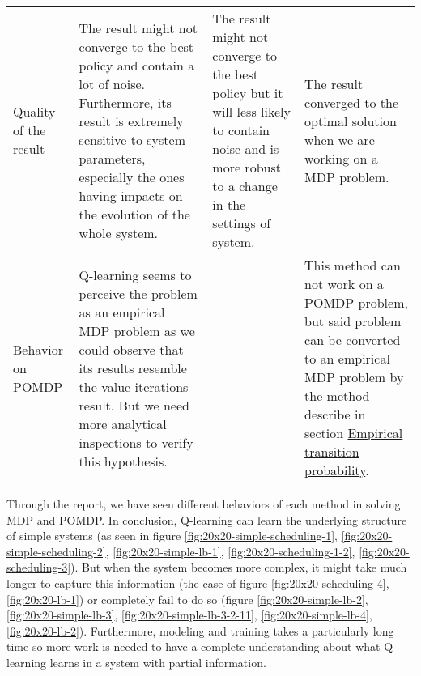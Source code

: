 \documentclass[
  a4paper, xcolor = usenames,dvipsnames]{article}
\theoremstyle{definition}
\theoremstyle{definition}
\theoremstyle{definition}
\theoremstyle{definition}
\theoremstyle{remark}
\begin{document}
\begin{longtable}[]{@{}llll@{}}
\begin{minipage}[t]{0.18\columnwidth}
Quality of the result\strut
\end{minipage} & \begin{minipage}[t]{0.35\columnwidth}\raggedright
The result might not converge to the best policy and contain a lot of noise. Furthermore, its result is extremely sensitive to system parameters, especially the ones having impacts on the evolution of the whole system.\strut
\end{minipage} & \begin{minipage}[t]{0.18\columnwidth}\raggedright
The result might not converge to the best policy but it will less likely to contain noise and is more robust to a change in the settings of system.\strut
\end{minipage} & \begin{minipage}[t]{0.18\columnwidth}\raggedright
The result converged to the optimal solution when we are working on a MDP problem.\strut
\end{minipage}\tabularnewline
\begin{minipage}[t]{0.18\columnwidth}\raggedright
Behavior on POMDP\strut
\end{minipage} & \begin{minipage}[t]{0.35\columnwidth}\raggedright
Q-learning seems to perceive the problem as an empirical MDP problem as we could observe that its results resemble the value iterations result. But we need more analytical inspections to verify this hypothesis.\strut
\end{minipage} & \begin{minipage}[t]{0.18\columnwidth}\raggedright
\strut
\end{minipage} & \begin{minipage}[t]{0.18\columnwidth}\raggedright
This method can not work on a POMDP problem, but said problem can be converted to an empirical MDP problem by the method describe in section \protect\hyperlink{empirical-transition-probability}{Empirical transition probability}.\strut
\end{minipage}\tabularnewline
\bottomrule
\end{longtable}

Through the report, we have seen different behaviors of each method in solving MDP and POMDP. In conclusion, Q-learning can learn the underlying structure of simple systems (as seen in figure \ref{fig:20x20-simple-scheduling-1}, \ref{fig:20x20-simple-scheduling-2}, \ref{fig:20x20-simple-lb-1}, \ref{fig:20x20-scheduling-1-2}, \ref{fig:20x20-scheduling-3}). But when the system becomes more complex, it might take much longer to capture this information (the case of figure \ref{fig:20x20-scheduling-4}, \ref{fig:20x20-lb-1}) or completely fail to do so (figure \ref{fig:20x20-simple-lb-2}, \ref{fig:20x20-simple-lb-3}, \ref{fig:20x20-simple-lb-3-2-11}, \ref{fig:20x20-simple-lb-4}, \ref{fig:20x20-lb-2}). Furthermore, modeling and training takes a particularly long time so more work is needed to have a complete understanding about what Q-learning learns in a system with partial information.
\end{document}
